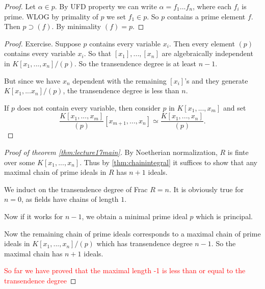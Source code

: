 \begin{proof}
    Let $\alpha\in p$. By UFD property we can write $\alpha=f_1...f_n$, where each $f_i$ is prime. WLOG by primality of $p$ we set $f_1\in p$. So $p$ contains a prime element $f$. Then $p\supset (f)$. By minimality $(f)=p$.
\end{proof}
\begin{proof}
    Exercise. Suppose $p$ contains every variable $x_i$. Then every element $(p)$ contains every variable $x_i$. So that $[x_1],...,[x_n]$ are algebraically independent in $K[x_1,...,x_n]/(p)$. So the transendence degree is at least $n-1$. 

    But since we have $x_n$ dependent with the remaining $[x_i]$'s and they generate $K[x_1,...x_n]/(p)$, the transendence degree is less than $n$. 

    If $p$ does not contain every variable, then consider $p$ in $K[x_1,...,x_m]$ and set \[\frac{K[x_1,...,x_m]}{(p)}[x_{m+1},...,x_n]\simeq \frac{K[x_1,...,x_n]}{(p)}.\]
\end{proof}
\begin{proof}[Proof of theorem \ref{thm:lecture17main}]
    By Noetherian normalization, $R$ is finte over some $K[x_1,...,x_n]$. Thus by \ref{thm:chainintegral} it suffices to show that any maximal chain of prime ideals in $R$ has $n+1$ ideals. 

    We induct on the transendence degree of Frac $R=n$. It is obviously true for $n=0$, as fields have chains of length $1$. 

    Now if it works for $n-1$, we obtain a minimal prime ideal $p$ which is principal. 

    Now the remaining chain of prime ideals corresponds to a maximal chain of prime ideals in $K[x_1,...,x_n]/(p)$ which has transendence degree $n-1$. So the maximal chain has $n+1$ ideals.


    \textcolor{red}{So far we have proved that the maximal length -1 is less than or equal to the transendence degree}

\end{proof}

